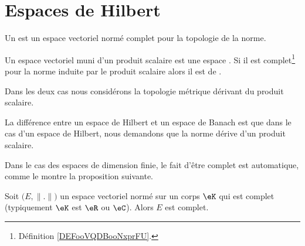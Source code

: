 
\section{Espaces de Hilbert}

\begin{definition}  \label{DefVKuyYpQ}
    Un  est un espace vectoriel normé complet pour la topologie de la norme. 
\end{definition}

\begin{definition}  \label{DefORuBdBN}
    Un espace vectoriel muni d'un produit scalaire est une espace . Si il est complet\footnote{Définition \ref{DEFooVQDBooNxprFU}.} pour la norme induite par le produit scalaire alors il est de .

    Dans les deux cas nous considérons la topologie métrique dérivant du produit scalaire.
\end{definition}

La différence entre un espace de Hilbert et un espace de Banach est que dans le cas d'un espace de Hilbert, nous demandons que la norme dérive d'un produit scalaire.

Dans le cas des espaces de dimension finie, le fait d'être complet est automatique, comme le montre la proposition suivante.
\begin{proposition}     \label{PROPooGJDTooXOoYfw}
    Soit \( \big( E,\| . \| \big)\) un espace vectoriel normé sur un corps \( \eK\) qui est complet (typiquement \( \eK\) est \( \eR\) ou \( \eC\)). Alors \( E\) est complet.
\end{proposition}

